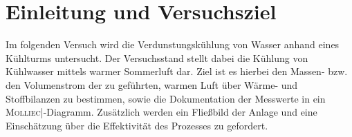 \section{Einleitung und Versuchsziel}
\label{sec:aufgabenstellung}

Im folgenden Versuch wird die Verdunstungskühlung von Wasser anhand eines Kühlturms untersucht. Der Versuchsstand stellt dabei die Kühlung von Kühlwasser mittels warmer Sommerluft dar. Ziel ist es hierbei den Massen- bzw. den Volumenstrom der zu geführten, warmen Luft über Wärme- und Stoffbilanzen zu bestimmen, sowie die Dokumentation der Messwerte in ein \textsc{Molliec|}-Diagramm. Zusätzlich werden ein Fließbild der Anlage und eine Einschätzung über die Effektivität des Prozesses zu gefordert. \\



